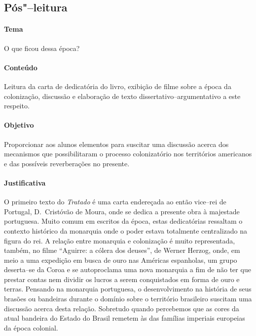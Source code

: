 \documentclass[12pt]{extarticle}
\begin{document}
{\subsection{Pós"--leitura}

\paragraph{Tema} O que ficou dessa época?

\paragraph{Conteúdo} Leitura da carta de dedicatória do livro, exibição de 
filme sobre a época da colonização, discussão e elaboração de texto 
dissertativo--argumentativo a este respeito.

\paragraph{Objetivo} Proporcionar aos alunos elementos para suscitar
uma discussão acerca dos mecanismos que possibilitaram o processo 
colonizatório nos territórios americanos e das possíveis reverberações
no presente.

\paragraph{Justificativa} O primeiro texto do \emph{Tratado} é uma carta
endereçada ao então vice--rei de Portugal, D.~Cristóvão de Moura, onde 
se dedica a presente obra à majestade portuguesa. Muito comum em escritos
da época, estas dedicatórias ressaltam o contexto histórico da monarquia 
onde o poder estava totalmente centralizado na figura do rei.
A relação entre monarquia e colonização é muito representada, também,
no filme ``Aguirre: a cólera dos deuses'', de Werner Herzog, onde, em
meio a uma expedição em busca de ouro nas Américas espanholas, um grupo 
deserta--se da Coroa e se autoproclama uma nova monarquia a fim de não ter 
que prestar contas nem dividir os lucros a serem conquistados em forma
de ouro e terras.
Pensando na monarquia portuguesa, o desenvolvimento na história de seus
brasões ou bandeiras durante o domínio sobre o território brasileiro
suscitam uma discussão acerca desta relação. Sobretudo quando percebemos
que as cores da atual bandeira do Estado do Brasil remetem às das famílias
imperiais europeias da época colonial. 

}
\end{document}
